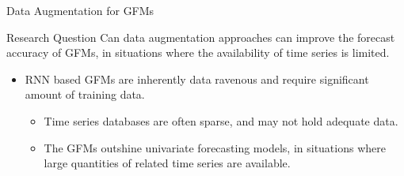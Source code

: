 \documentclass{beamer}
\begin{document}


\begin{frame}{Data Augmentation for GFMs}
   \begin{block}{Research Question}	
	Can data augmentation approaches can improve the forecast accuracy of GFMs, in situations where the availability of time series is limited.
	\end{block}
	\begin{itemize}
	\item RNN based GFMs are inherently data ravenous and require significant amount of training data. 
	\vspace{3mm}
		\begin{itemize}
		\item \color{blue} Time series databases are often sparse, and may not hold adequate data.
		\item \color{blue} The GFMs outshine univariate forecasting models, in situations where large quantities of related time series are available.
		\end{itemize}
 \end{itemize}
\end{frame}
\end{document}
